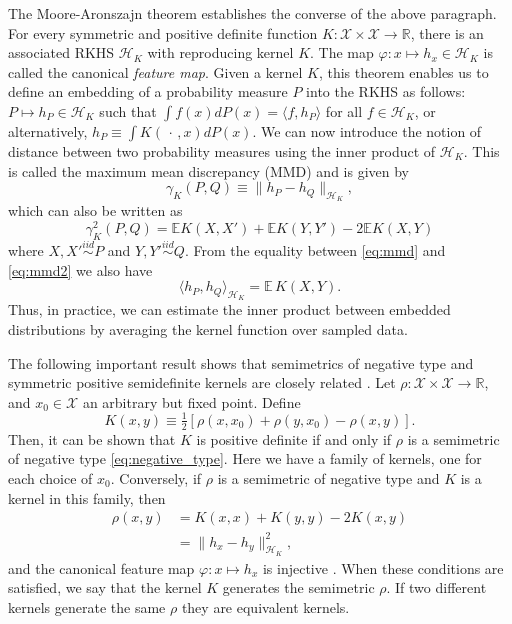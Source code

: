 \documentclass[aps,preprint,nofootinbib,floatfix]{revtex4-1}
\newcommand\E{\mathbb{E}}
\newcommand\kk{K}
\newcommand\kkk{h}
\newcommand\Hk{{\mathcal{H}}_{\kk}}
\begin{document}
The Moore-Aronszajn theorem 
\cite{Aronszajn}
establishes the converse of the above paragraph. 
For every symmetric
and positive definite function $\kk: \mathcal{X}\times \mathcal{X} \to
\mathbb{R}$, there is an associated RKHS $\Hk$ 
with reproducing
kernel $\kk$. The map $\varphi: x \mapsto \kkk_x \in \Hk$ is called
the canonical \emph{feature map}. Given a kernel $\kk$,
this theorem enables us to define an embedding of a probability measure
$P$ into the RKHS as follows: $P \mapsto \kkk_P \in
\Hk$ such that 
$\int f(x) d P(x) = \langle f, \kkk_P \rangle$ for all $f \in \Hk$,
or alternatively, $\kkk_P \equiv \int \kk( \, \cdot \,, x)  d P(x)$. 
We can now  introduce the 
notion of distance between two probability measures using the inner product
of $\Hk$. This is called the maximum mean discrepancy (MMD) and
is given by
\begin{equation}\label{eq:mmd}
\gamma_\kk(P,Q) \equiv \| \kkk_P - \kkk_Q \|_{\Hk},
\end{equation}
which can also be written as \cite{Gretton2012}
\begin{equation}\label{eq:mmd2}
\gamma_\kk^2(P,Q) = \E \kk(X,X') + \E \kk(Y,Y') - 2 \E \kk(X, Y)
\end{equation}
where $X,X' \stackrel{iid}{\sim} P$ and $Y,Y'\stackrel{iid}{\sim} Q$.
From the equality between \eqref{eq:mmd} and \eqref{eq:mmd2} we also
have 
\begin{equation}\label{eq:inner_data}
\langle \kkk_P, \kkk_Q \rangle_{\Hk} = \E \, \kk(X, Y).
\end{equation}
Thus, in practice, we can estimate the inner product between  
embedded distributions 
by averaging the kernel function over sampled data.

The following important result shows that semimetrics of negative
type and symmetric positive semidefinite kernels are closely related
\cite{Berg1984}. Let $\rho: \mathcal{X} \times \mathcal{X} \to \mathbb{R}$,
and $x_0 \in \mathcal{X}$ an arbitrary but fixed point.
Define
\begin{equation}
\label{eq:kernel_semimetric}
\kk(x,y) \equiv 
\tfrac{1}{2} \left[  \rho(x,x_0) + \rho(y,x_0) - \rho(x,y)\right].
\end{equation}
Then, it can be shown that 
$\kk$ is positive definite if and only if $\rho$ is a semimetric
of negative type
\eqref{eq:negative_type}.
Here we have a family of kernels, one for each choice of $x_0$. Conversely,
if $\rho$ is a semimetric of negative type and $\kk$ is a kernel in this
family, then 
\begin{equation}
\label{eq:gen_kernel}
\begin{split}
\rho(x,y) &= \kk(x,x) + \kk(y,y) -2\kk(x,y) \\
&=  \| \kkk_x - \kkk_y \|^2_{\Hk},
\end{split}
\end{equation}
and the canonical feature map 
$\varphi: x \mapsto \kkk_x$ is injective \cite{Sejdinovic2013}.
When these conditions are satisfied, we say that the kernel $\kk$ 
generates the semimetric $\rho$. 
If two different kernels generate the same $\rho$ they are
equivalent kernels.
\end{document}

